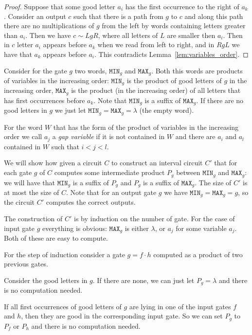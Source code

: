 \documentclass[11pt,letterpaper]{article}
\newcommand{\mmin}{\texttt{MIN}}
\newcommand{\mmax}{\texttt{MAX}}
\begin{document}
\begin{proof}
Suppose that some good letter $a_i$ has the first occurrence to the right of $a_k$. Consider an output $c$ such that there is a path from $g$ to $c$ and along this path there are no multiplications of $g$ from the left by words containing letters greater than $a_i$. Then we have $c \sim LgR$, where all letters of $L$ are smaller then $a_i$. Then in $c$ letter $a_i$ appears before $a_k$ when we read from left to right, and in $RgL$ we have that $a_k$ appears before $a_i$. This contradicts Lemma~\ref{lem:variables_order}.
\end{proof}

Consider for the gate $g$ two words, $\mmin_g$ and $\mmax_g$. Both this words are products of variables in the increasing order: $\mmin_g$ is the product of good letters of $g$ in the increasing order, $\mmax_g$ is the product (in the increasing order) of all letters that has first occurrences before $a_k$. Note that $\mmin_g$ is a suffix of $\mmax_g$. If there are no good letters in $g$ we just let $\mmin_g=\mmax_g=\lambda$ (the empty word).

For the word $W$ that has the form of the product of variables in the increasing order we call $a_j$ a \emph{gap variable} if it is not contained in $W$ and there are $a_i$ and $a_l$ contained in $W$ such that $i<j<l$.
 
We will show how given a circuit $C$ to construct an interval circuit $C'$ that for each gate $g$ of $C$ computes some intermediate product $P_g$ between $\mmin_g$ and $\mmax_g$: we will have that $\mmin_g$ is a suffix of $P_g$ and $P_g$ is a suffix of $\mmax_g$. The size of $C'$ is at most the size of $C$.
Note that for an output gate $g$ we have $\mmin_g=\mmax_g=g$, so the circuit $C'$ computes the correct outputs.

The construction of $C'$ is by induction on the number of gate. For the case of input gate $g$ everything is obvious: $\mmax_g$ is either $\lambda$, or $a_j$ for some variable $a_j$. Both of these are easy to compute.

For the step of induction consider a gate $g=f\cdot h$ computed as a product of two previous gates.

Consider the good letters in $g$. If there are none, we can just let $P_g=\lambda$ and there is no computation needed.

If all first occurrences of good letters of $g$ are lying in one of the input gates $f$ and $h$, then they are good in the corresponding input gate. So we can set $P_g$ to $P_f$ or $P_h$ and there is no computation needed.
\end{document}
